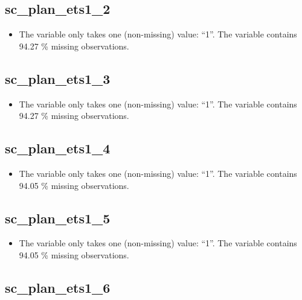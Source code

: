 \documentclass[
  letterpaper,
  DIV=11,
  numbers=noendperiod]{scrartcl}
\providecommand{\tightlist}{%
  \setlength{\itemsep}{0pt}\setlength{\parskip}{0pt}}
\begin{document}
\subsection{sc\_plan\_ets1\_2}\label{sc_plan_ets1_2}

\begin{itemize}
\tightlist
\item
  The variable only takes one (non-missing) value: ``1''. The variable
  contains 94.27 \% missing observations.
\end{itemize}

\fullline

\subsection{sc\_plan\_ets1\_3}\label{sc_plan_ets1_3}

\begin{itemize}
\tightlist
\item
  The variable only takes one (non-missing) value: ``1''. The variable
  contains 94.27 \% missing observations.
\end{itemize}

\fullline

\subsection{sc\_plan\_ets1\_4}\label{sc_plan_ets1_4}

\begin{itemize}
\tightlist
\item
  The variable only takes one (non-missing) value: ``1''. The variable
  contains 94.05 \% missing observations.
\end{itemize}

\fullline

\subsection{sc\_plan\_ets1\_5}\label{sc_plan_ets1_5}

\begin{itemize}
\tightlist
\item
  The variable only takes one (non-missing) value: ``1''. The variable
  contains 94.05 \% missing observations.
\end{itemize}

\fullline

\subsection{sc\_plan\_ets1\_6}\label{sc_plan_ets1_6}
\end{document}
